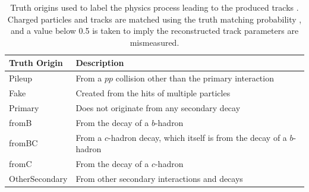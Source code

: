 \begin{table}[h]
  \begin{center}
      \begin{tabular}{ll} 
      	 \hline \hline
          Truth Origin & Description \\ \hline
          Pileup           & From a $pp$ collision other than the primary interaction   \\
          Fake             & Created from the hits of multiple particles  \\
          Primary          & Does not originate from any secondary decay  \\
          fromB            & From the decay of a $b$-hadron  \\
          fromBC           & From a $c$-hadron decay, which itself is from the decay of a $b$-hadron   \\
          fromC            & From the decay of a $c$-hadron \\
          OtherSecondary   & From other secondary interactions and decays  \\ \hline \hline
      \end{tabular}
    \caption{Truth origins used to label the physics process leading to the produced tracks \cite{ATL-PHYS-PUB-2022-027}. Charged particles and tracks are matched using the truth matching probability \cite{ATLAS-tracks-algo}, and a value below 0.5 is taken to imply the reconstructed track parameters are mismeasured.}
    \label{tab:gnTrackOrigin}
  \end{center}
\end{table}

